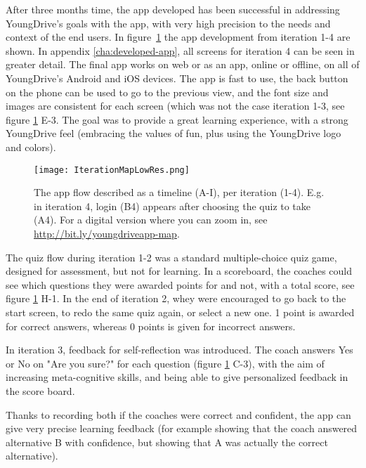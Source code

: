 After three months time, the app developed has been successful in addressing YoungDrive's goals with the app, with very high precision to the needs and context of the end users. In figure~\ref{fig:iteration-map} the app development from iteration 1-4 are shown. In appendix \ref{cha:developed-app}, all screens for iteration 4 can be seen in greater detail. The final app works on web or as an app, online or offline, on all of YoungDrive's Android and iOS devices. The app is fast to use, the back button on the phone can be used to go to the previous view, and the font size and images are consistent for each screen (which was not the case iteration 1-3, see figure \ref{fig:iteration-map} E-3. The goal was to provide a great learning experience, with a strong YoungDrive feel (embracing the values of fun, plus using the YoungDrive logo and colors).

  \begin{figure}[h]
    \centering
    \texttt{[image: IterationMapLowRes.png]}
    \caption{The app flow described as a timeline (A-I), per iteration (1-4). E.g. in iteration 4, login (B4) appears after choosing the quiz to take (A4). For a digital version where you can zoom in, see \url{http://bit.ly/youngdriveapp-map}.}
    \label{fig:iteration-map}
  \end{figure}

  \clearpage


  The quiz flow during iteration 1-2 was a standard multiple-choice quiz game, designed for assessment, but not for learning. In a scoreboard, the coaches could see which questions they were awarded points for and not, with a total score, see figure \ref{fig:iteration-map} H-1. In the end of iteration 2, whey were encouraged to go back to the start screen, to redo the same quiz again, or select a new one. 1 point is awarded for correct answers, whereas 0 points is given for incorrect answers.

  In iteration 3, feedback for self-reflection was introduced. The coach answers Yes or No on "Are you sure?" for each question (figure \ref{fig:iteration-map} C-3), with the aim of increasing meta-cognitive skills, and being able to give personalized feedback in the score board.

  Thanks to recording both if the coaches were correct and confident, the app can give very precise learning feedback (for example showing that the coach answered alternative B with confidence, but showing that A was actually the correct alternative).


